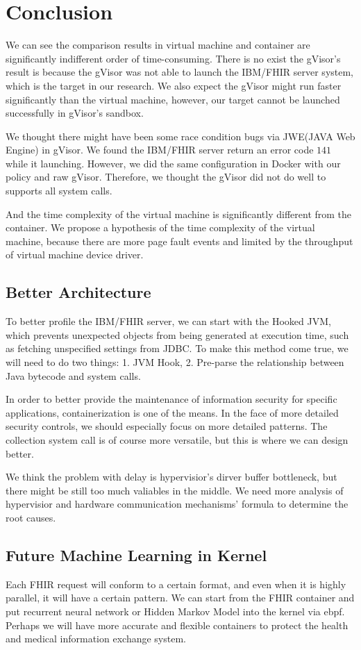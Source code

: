 \chapter{Conclusion}

We can see the comparison results in virtual machine and container are
significantly indifferent order of time-consuming. There is no exist
the gVisor's result is because the gVisor was not able to launch the
IBM/FHIR server system, which is the target in our research.
We also expect the gVisor might run faster significantly than the virtual
machine, however, our target cannot be launched successfully in
gVisor's sandbox.

We thought there might have been some race condition bugs via JWE(JAVA Web
Engine) in gVisor. We found the IBM/FHIR server return an error code $141$
while it launching. However, we did the same configuration in Docker with
our policy and raw gVisor. Therefore, we thought the gVisor did not do
well to supports all system calls.

And the time complexity of the virtual machine is significantly different from
the container. We propose a hypothesis of the time complexity of the virtual
machine, because there are more page fault events and limited by the
throughput of virtual machine device driver\cite{10.5555/1267569.1267570,7095802}.

\section{Better Architecture}
To better profile the IBM/FHIR server, we can start with the Hooked JVM,
which prevents unexpected objects from being generated at execution time,
such as fetching unspecified settings from JDBC. To make this method come
true, we will need to do two things: 1. JVM Hook, 2. Pre-parse the relationship
between Java bytecode and system calls.

In order to better provide the maintenance of information security for specific
applications, containerization is one of the means. In the face of more detailed
security controls, we should especially focus on more detailed patterns. The
collection system call is of course more versatile, but this is where we can
design better.

We think the problem with delay is hypervisior's dirver buffer bottleneck, but
there might be still too much valiables in the middle. We need more analysis of
hypervisior and hardware communication mechanisms' formula to determine the root
causes.

\section{Future Machine Learning in Kernel}
Each FHIR request will conform to a certain format, and even when it is highly
parallel, it will have a certain pattern. We can start from the FHIR container
and put recurrent neural network or Hidden Markov Model into the kernel via ebpf.
Perhaps we will have more accurate and flexible containers to protect the health
and medical information exchange system.
